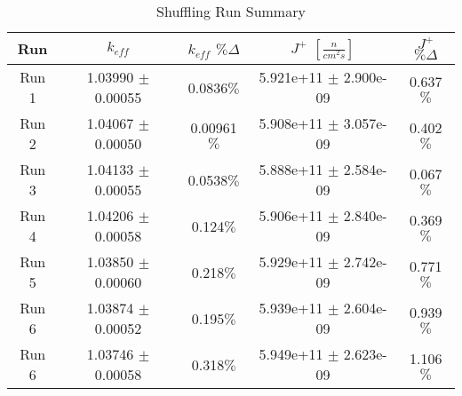 

\begin{table}[H]
\centering
 \begin{tabularx}{0.7\textwidth}{c  c  c  c  c}
 	\hline
 	Run & $k_{eff}$ & $k_{eff}$ $\% \Delta$ & $J^+$  $[\frac{n}{cm^2s}]$ & $J^+$ $\% \Delta$ \\
 	\hline
 	Run 1 & 1.03990 $\pm$ 0.00055 & 0.0836$\%$ & 5.921e+11 $\pm$ 2.900e-09 & 0.637$\%$ \\
 	Run 2 & 1.04067 $\pm$ 0.00050 & 0.00961$\%$ & 5.908e+11 $\pm$ 3.057e-09 & 0.402$\%$ \\
 	Run 3 & 1.04133 $\pm$ 0.00055 & 0.0538$\%$ & 5.888e+11 $\pm$ 2.584e-09 & 0.067$\%$  \\
 	Run 4 & 1.04206 $\pm$ 0.00058 & 0.124$\%$ & 5.906e+11 $\pm$ 2.840e-09 & 0.369$\%$ \\
 	Run 5 & 1.03850 $\pm$ 0.00060 & 0.218$\%$ & 5.929e+11 $\pm$ 2.742e-09 & 0.771$\%$  \\
 	Run 6 & 1.03874 $\pm$ 0.00052 & 0.195$\%$ & 5.939e+11 $\pm$ 2.604e-09 & 0.939$\%$ \\
 	Run 6 & 1.03746 $\pm$ 0.00058 & 0.318$\%$ & 5.949e+11 $\pm$ 2.623e-09 & 1.106$\%$ \\
 	\hline

 \end{tabularx}
\caption{Shuffling Run Summary}
\label{table:shufsens}
\end{table}